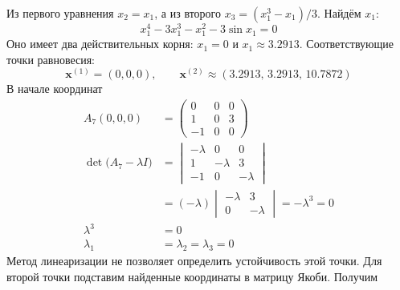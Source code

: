 Из первого уравнения $x_2=x_1$, а из второго
$x_3=(x_1^3-x_1)/3$. Найдём $x_1$:
\begin{equation}
  x_1^4-3x_1^3-x_1^2-3\sin x_1=0
\end{equation}
Оно имеет два действительных корня: $x_1=0$ и
$x_1\approx3.2913$. Соответствующие точки равновесия:
\begin{equation}
  \bm x^{(1)}=(0,0,0),\qquad
  \bm x^{(2)}\approx(3.2913,\,3.2913,\,10.7872)
\end{equation}
В начале координат
\begin{equation}
  \begin{aligned}
    A_7(0,0,0)&=
    \begin{pmatrix}
      0 & 0 & 0\\
      1 & 0 & 3\\
      -1 & 0 & 0
    \end{pmatrix}\\
    \det\bigl(A_7-\lambda I\bigr)
    &=
    \begin{vmatrix}
      -\lambda & 0 & 0\\
      1 & -\lambda & 3\\
      -1 & 0 & -\lambda
    \end{vmatrix}\\
    &=(-\lambda)
    \begin{vmatrix}
      -\lambda & 3\\
      0 & -\lambda
    \end{vmatrix}
    =-\lambda^3=0\\
    \lambda^3&=0\\
    \lambda_1&=\lambda_2=\lambda_3=0
  \end{aligned}
\end{equation}
Метод линеаризации не позволяет определить устойчивость этой точки. Для
второй точки подставим найденные координаты в матрицу Якоби. Получим
